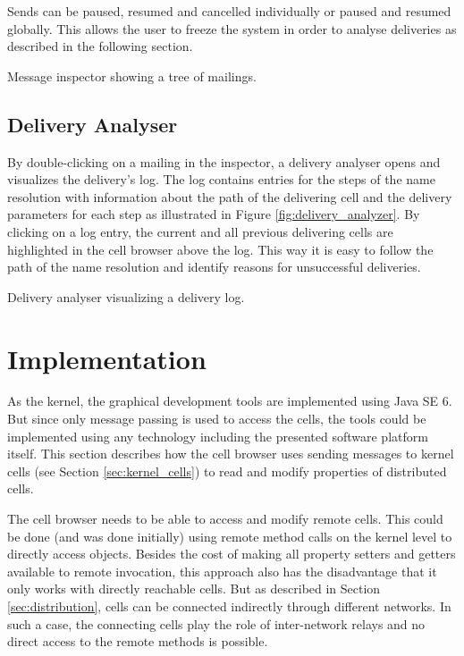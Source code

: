 Sends can be paused, resumed and cancelled individually or paused and resumed globally. This allows the user to freeze the system in order to analyse deliveries as described in the following section.

{Message inspector showing a tree of mailings.}

\subsection{Delivery Analyser}

By double-clicking on a mailing in the inspector, a delivery analyser opens and visualizes the delivery's log. The log contains entries for the steps of the name resolution with information about the path of the delivering cell and the delivery parameters for each step as illustrated in Figure \ref{fig:delivery_analyzer}. By clicking on a log entry, the current and all previous delivering cells are highlighted in the cell browser above the log. This way it is easy to follow the path of the name resolution and identify reasons for unsuccessful deliveries.

{Delivery analyser visualizing a delivery log.}

\section{Implementation}

As the kernel, the graphical development tools are implemented using Java SE 6. But since only message passing is used to access the cells, the tools could be implemented using any technology including the presented software platform itself. This section describes how the cell browser uses sending messages to kernel cells (see Section \ref{sec:kernel_cells}) to read and modify properties of distributed cells.

The cell browser needs to be able to access and modify remote cells. This could be done (and was done initially) using remote method calls on the kernel level to directly access  objects. Besides the cost of making all property setters and getters available to remote invocation, this approach also has the disadvantage that it only works with directly reachable cells. But as described in Section \ref{sec:distribution}, cells can be connected indirectly through different networks. In such a case, the connecting cells play the role of inter-network relays and no direct access to the remote methods is possible.

